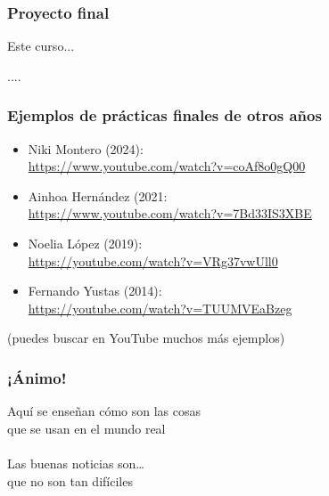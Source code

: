 
\begin{frame}
 \frametitle{Proyecto final}

Este curso...

\vspace{1cm}

\begin{center}
  \Huge ....
\end{center}
\end{frame}



\begin{frame}
\frametitle{Ejemplos de prácticas finales de otros años}

\begin{itemize}
\item Niki Montero (2024): \\ \url{https://www.youtube.com/watch?v=coAf8o0gQ00}
\item Ainhoa Hernández (2021: \\ \url{https://www.youtube.com/watch?v=7Bd33IS3XBE}
\item Noelia López (2019): \\ \url{https://youtube.com/watch?v=VRg37vwUll0}
\item Fernando Yustas (2014):\\ \url{https://youtube.com/watch?v=TUUMVEaBzeg}
\end{itemize}

(puedes buscar en YouTube muchos más ejemplos)

\end{frame}




\begin{frame}
\frametitle{¡Ánimo!}

\begin{center}
{\huge Aquí se enseñan cómo son las cosas \\
  que se usan en el mundo real \\
  ~ \\
  Las buenas noticias son\dots \\
  que no son tan difíciles\\}
\end{center}

\end{frame}



